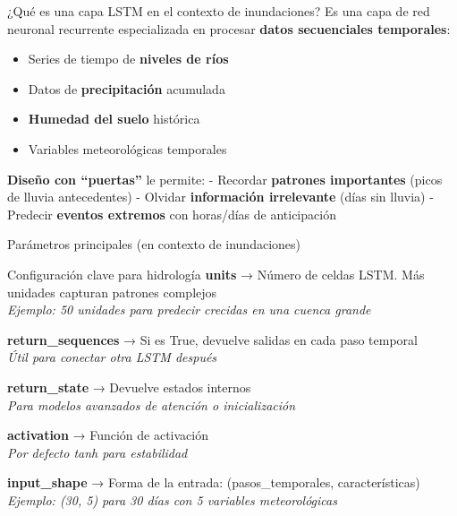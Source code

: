 \documentclass[
  ignorenonframetext,
]{beamer}
\providecommand{\tightlist}{%
  \setlength{\itemsep}{0pt}\setlength{\parskip}{0pt}}
\begin{document}
\begin{frame}{¿Qué es una capa LSTM en el contexto de inundaciones?}
\label{quuxe9-es-una-capa-lstm-en-el-contexto-de-inundaciones}
Es una capa de red neuronal recurrente especializada en procesar
\textbf{datos secuenciales temporales}:

\begin{itemize}
\tightlist
\item
  Series de tiempo de \textbf{niveles de ríos}
\item
  Datos de \textbf{precipitación} acumulada\\
\item
  \textbf{Humedad del suelo} histórica
\item
  Variables meteorológicas temporales
\end{itemize}

\textbf{Diseño con ``puertas''} le permite: - Recordar \textbf{patrones
importantes} (picos de lluvia antecedentes) - Olvidar
\textbf{información irrelevante} (días sin lluvia) - Predecir
\textbf{eventos extremos} con horas/días de anticipación
\end{frame}

\begin{frame}{Parámetros principales (en contexto de inundaciones)}
\label{paruxe1metros-principales-en-contexto-de-inundaciones}
\begin{block}{Configuración clave para hidrología}
\label{configuraciuxf3n-clave-para-hidrologuxeda}
\textbf{units} → Número de celdas LSTM. Más unidades capturan patrones
complejos\\
\emph{Ejemplo: 50 unidades para predecir crecidas en una cuenca grande}

\textbf{return\_sequences} → Si es True, devuelve salidas en cada paso
temporal\\
\emph{Útil para conectar otra LSTM después}

\textbf{return\_state} → Devuelve estados internos\\
\emph{Para modelos avanzados de atención o inicialización}

\textbf{activation} → Función de activación\\
\emph{Por defecto tanh para estabilidad}

\textbf{input\_shape} → Forma de la entrada: (pasos\_temporales,
características)\\
\emph{Ejemplo: (30, 5) para 30 días con 5 variables meteorológicas}
\end{block}
\end{frame}
\end{document}
